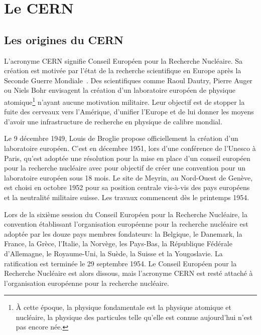 \section{Le CERN}\label{chapter-LHC-section-CERN}
\subsection{Les origines du CERN}
L'acronyme \og CERN \fg{} signifie Conseil Européen pour la Recherche Nucléaire.
Sa création est motivée par l'état de la recherche scientifique en Europe après la Seconde Guerre Mondiale~\cite{CERN_website}.
Des scientifiques comme Raoul Dautry, Pierre Auger ou Niels Bohr envisagent la création d'un laboratoire européen de physique atomique\footnote{À cette époque, la physique fondamentale est la physique atomique et nucléaire, la physique des particules telle qu'elle est connue aujourd'hui n'est pas encore née.} n'ayant aucune motivation militaire.
Leur objectif est de stopper la fuite des cerveaux vers l'Amérique, d'unifier l'Europe et de lui donner les moyens d'avoir une infrastructure de recherche en physique de calibre mondial.
\par Le 9 décembre 1949, Louis de Broglie propose officiellement la création d'un laboratoire européen.
C'est en décembre 1951, lors d'une conférence de l'Unesco à Paris, qu'est adoptée une résolution pour la mise en place d'un conseil européen pour la recherche nucléaire avec pour objectif de créer une convention pour un laboratoire européen sous 18 mois.
Le site de Meyrin, au Nord-Ouest de Genève, est choisi en octobre 1952 pour sa position centrale vis-à-vis des pays européens et la neutralité militaire suisse. Les travaux commencent dès le printemps 1954.
\par Lors de la sixième session du Conseil Européen pour la Recherche Nucléaire, la convention établissant l'organisation européenne pour la recherche nucléaire est adoptée par les douze pays membres fondateurs: la Belgique, le Danemark, la France, la Grèce, l'Italie, la Norvège, les Pays-Bas, la République Fédérale d'Allemagne, le Royaume-Uni, la Suède, la Suisse et la Yougoslavie.
La ratification est terminée le 29 septembre 1954.
Le Conseil Européen pour la Recherche Nucléaire est alors dissous, mais l'acronyme CERN est resté attaché à l'organisation européenne pour la recherche nucléaire.

